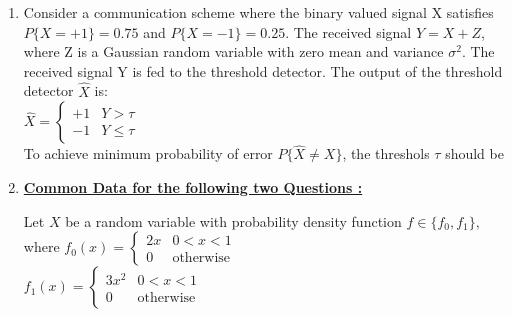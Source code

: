 
\renewcommand{\theequation}{\theenumi}
\renewcommand{\thefigure}{\theenumi}
\renewcommand{\thetable}{\theenumi}
\begin{enumerate}[label=\thesection.\arabic*.,ref=\thesection.\theenumi]


\item Consider a communication scheme where the binary valued signal X satisfies $P\{X = +1\} = 0.75$ and $P\{X = -1\} = 0.25$. The received signal $Y = X+Z$, where Z is a Gaussian random variable with zero mean and variance $\sigma^2$. The received signal Y is fed to the threshold detector. The output of the threshold detector $\hat X$ is:\\
{\centering $
{\hat X}= 
\begin{cases} 
+1 & Y> \tau \\
-1 & Y \leqslant \tau 
\end{cases}
$\\}
To achieve minimum probability of error $P\{\hat X \neq X\}$, the threshols $ \tau$ should be

\begin{enumerate}
\end{enumerate}
%

\item 
\begin{center}
    \centering\underline{\textbf{Common Data for the following two Questions :}}
    \end{center}
    Let $X$ be a random variable with probability density function $f \in \{f_0,f_1\},$ where     
$ 
f_0(x)=
\begin{cases}
2x & 0<x<1 \\
0 & \text{otherwise}
\end{cases}
$ \\

$ 
f_1(x)=
\begin{cases}
3x^2 &  0<x<1 \\
0 & \text{otherwise}
\end{cases}
$\\


\end{enumerate}
